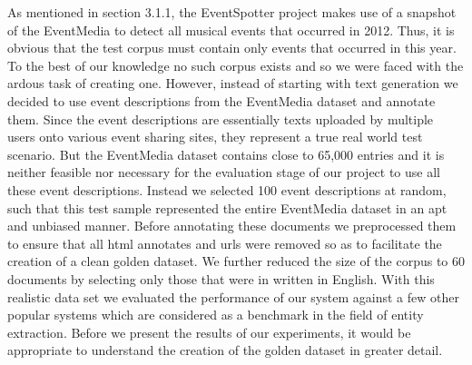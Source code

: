 \documentclass[a4paper,11pt]{report}
\begin{document}
As mentioned in section 3.1.1, the EventSpotter project makes use of a snapshot of the EventMedia to detect all musical events that occurred in 2012. Thus, it is obvious that the test corpus must contain only events that occurred in this year. To the best of our knowledge no such corpus exists and so we were faced with the ardous task of creating one. However, instead of starting with text generation we decided to use event descriptions from the EventMedia dataset and annotate them. Since the event descriptions are essentially texts uploaded by multiple users onto various event sharing sites, they represent a true real world test scenario. But the EventMedia dataset contains close to 65,000 entries and it is neither feasible nor necessary for the evaluation stage of our project to use all these event descriptions. Instead we selected 100 event descriptions at random, such that this test sample represented the entire EventMedia dataset in an apt and unbiased manner. Before annotating these documents we preprocessed them to ensure that all html annotates and urls were removed so as to facilitate the creation of a clean golden dataset. We further reduced the size of the corpus to 60 documents by selecting only those that were in written in English. With this realistic data set we evaluated the performance of our system against a few other popular systems which are considered as a benchmark in the field of entity extraction. Before we present the results of our experiments, it would be appropriate to understand the creation of the golden dataset in greater detail.

\end{document}
